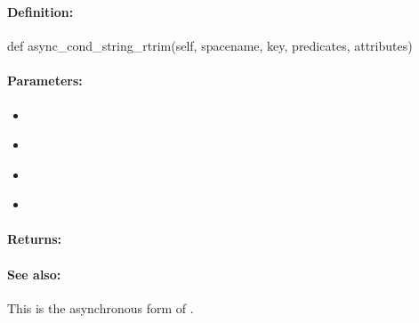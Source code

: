 \pagebreak
\subsubsection{}
\label{api:python:async_cond_string_rtrim}


\paragraph{Definition:}
\begin{pythoncode}
def async_cond_string_rtrim(self, spacename, key, predicates, attributes)
\end{pythoncode}

\paragraph{Parameters:}
\begin{itemize}[noitemsep]
\item {}\\

\item {}\\

\item {}\\

\item {}\\

\end{itemize}

\paragraph{Returns:}


\paragraph{See also:}  This is the asynchronous form of .

\pagebreak
\subsubsection{}
\label{api:python:group_string_rtrim}


